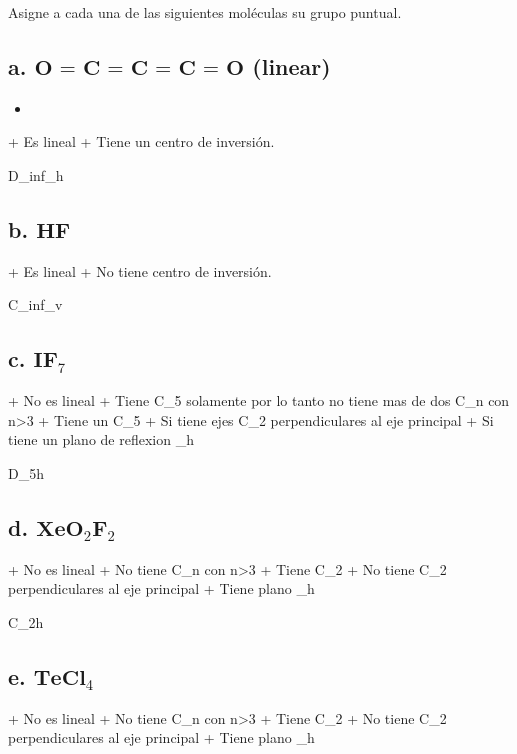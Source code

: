 Asigne a cada una de las siguientes moléculas su grupo puntual.

\subsection*{a. $\textbf{O = C = C = C = O}$ (linear)}

\begin{itemize}
    \item
\end{itemize}


+ Es lineal
+ Tiene un centro de inversión.


D_inf_h


\subsection*{b. $\textbf{HF}$}

+ Es lineal
+ No tiene centro de inversión.


C_inf_v


\subsection*{c. $\textbf{IF}_7$}

+ No es lineal
+ Tiene C_5 solamente por lo tanto no tiene mas de dos C_n con n>3
+ Tiene un C_5
+ Si tiene ejes C_2 perpendiculares al eje principal
+ Si tiene un plano de reflexion \sigma_h


D_5h


\subsection*{d. $\textbf{XeO}_2 \textbf{F}_2$}

+ No es lineal
+ No tiene C_n con n>3
+ Tiene C_2
+ No tiene C_2 perpendiculares al eje principal
+ Tiene plano \sigma_h


C_2h


\subsection*{e. $\textbf{TeCl}_4$}

+ No es lineal
+ No tiene C_n con n>3
+ Tiene C_2
+ No tiene C_2 perpendiculares al eje principal
+ Tiene plano \sigma_h


